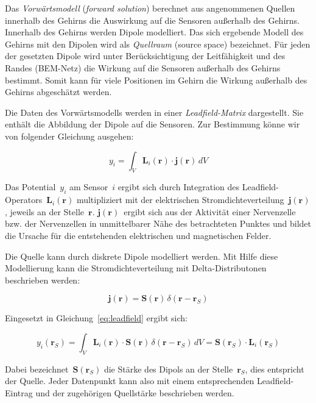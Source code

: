 \documentclass[doc,a4paper,12pt]{apa6}
\newcommand{\mx}[1]{\mathbf{#1}}
\begin{document}
Das \emph{Vorwärtsmodell} (\emph{forward solution}) berechnet aus angenommenen Quellen innerhalb des Gehirns die Auswirkung auf die Sensoren außerhalb des Gehirns. Innerhalb des Gehirns werden Dipole modelliert. Das sich ergebende Modell des Gehirns mit den Dipolen wird als \emph{Quellraum} (source space) bezeichnet. Für jeden der gesetzten Dipole wird unter Berücksichtigung der Leitfähigkeit und des Randes (BEM-Netz) die Wirkung auf die Sensoren außerhalb des Gehirns bestimmt. Somit kann für viele Positionen im Gehirn die Wirkung außerhalb des Gehirns abgeschätzt werden.

Die Daten des Vorwärtsmodells werden in einer \emph{Leadfield-Matrix} dargestellt. Sie enthält die Abbildung der Dipole auf die Sensoren. Zur Bestimmung könne wir von folgender Gleichung ausgehen:

\begin{equation}
y_i = \int_V \mx{L}_i (\mx{r}) \cdot \mx{j} (\mx{r})\, dV
\label{eq:leadfield}
\end{equation}

Das Potential~$y_i$ am Sensor~$i$ ergibt sich durch Integration des Leadfield-Operators~$\mx{L}_i(\mx{r})$ multipliziert mit der elektrischen Stromdichteverteilung~$\mx{j}(\mx{r})$, jeweils an der Stelle~$\mx{r}$. $\mx{j}(\mx{r})$~ergibt sich aus der Aktivität einer Nervenzelle bzw. der Nervenzellen in unmittelbarer Nähe des betrachteten Punktes und bildet die Ursache für die entstehenden elektrischen und magnetischen Felder.

Die Quelle kann durch diskrete Dipole modelliert werden. Mit Hilfe diese Modellierung kann die Stromdichteverteilung mit Delta-Distributonen beschrieben werden:

\begin{equation}
\mx{j} (\mx{r}) = \mx{S}(\mx{r})\,\delta(\mx{r}-\mx{r}_S)
\end{equation}

Eingesetzt in Gleichung~\ref{eq:leadfield} ergibt sich:

\begin{equation}
\label{eq:leadfield2}
y_i(\mx{r}_S) = \int_V \mx{L}_i (\mx{r}) \cdot \mx{S}(\mx{r})\,\delta(\mx{r}-\mx{r}_S)\, dV = \mx{S}(\mx{r}_S) \cdot \mx{L}_i(\mx{r}_S)
\end{equation}

Dabei bezeichnet~$\mx{S}(\mx{r}_S)$ die Stärke des Dipols an der Stelle~$\mx{r}_S$, dies entspricht der Quelle. Jeder Datenpunkt kann also mit einem entsprechenden Leadfield-Eintrag und der zugehörigen Quellstärke beschrieben werden.
\end{document}

